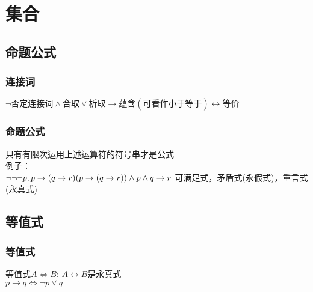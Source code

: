 \documentclass{book}
\begin{document}
\chapter{集合}
\section{命题公式}
\subsection{连接词}
$
\neg 否定连接词
\land 合取
\lor 析取
\to 蕴含(\mbox{可看作小于等于})
\leftrightarrow 等价
$
\subsection{命题公式}
只有有限次运用上述运算符的符号串才是公式\\
例子：\\
$\neg\neg\neg p,\\
p\to (q\to r)\\
(p\to (q\to r))\land p\land q\to r
$
可满足式，矛盾式(永假式)，重言式(永真式)
\section{等值式}
\subsection{等值式}
等值式$A\Leftrightarrow B$: $A\leftrightarrow B$是永真式\\
$p\to q \Leftrightarrow \neg p \lor q$
\end{document}
